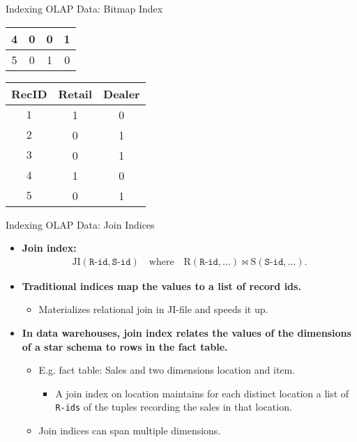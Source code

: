 \begin{frame}{Indexing OLAP Data: Bitmap Index}
\begin{tabular}{| c | c | c | c |}
		4              & 0             & 0               & 1                \\\hline
		5              & 0             & 1               & 0                \\\hline
	\end{tabular}\hspace{0.1cm}
	\begin{tabular}{| c | c | c |}
		\hline
		\textbf{RecID} & \textbf{Retail} & \textbf{Dealer} \\\hline
		$1$            & 1               & 0               \\\hline
		$2$            & 0               & 1               \\\hline
		$3$            & 0               & 1               \\\hline
		$4$            & 1               & 0               \\\hline
		$5$            & 0               & 1               \\\hline
	\end{tabular}
\end{frame}

\begin{frame}{Indexing OLAP Data: Join Indices}
	\begin{itemize}
		\item \textbf{Join index:}
		      \begin{align}
			      \text{JI}(\texttt{R-id}, \texttt{S-id}) \quad \text{where} \quad \text{R}(\texttt{R-id}, \ldots) \bowtie  \text{S}(\texttt{S-id}, \ldots).
		      \end{align}
		\item \textbf{Traditional indices map the values to a list of record ids.}
		      \begin{itemize}
			      \item Materializes relational join in JI-file and speeds it up.
		      \end{itemize}
		\item \textbf{In data warehouses, join index relates the values of the dimensions \\ of a star schema to rows in the fact table.}
		      \begin{itemize}
			      \item E.g. fact table: Sales and two dimensions location and item.
			            \begin{itemize}
				            \item A join index on location maintains for each distinct location a list of \texttt{R-ids} of the tuples recording the sales in that location.
			            \end{itemize}
			      \item Join indices can span multiple dimensions.
		      \end{itemize}
	\end{itemize}
\end{frame}

